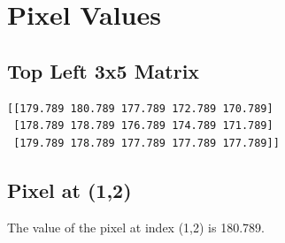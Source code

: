 \documentclass[journal]{IEEEtran}
\begin{document}
\section{Pixel Values}

\subsection{Top Left 3x5 Matrix}
\begin{verbatim}
[[179.789 180.789 177.789 172.789 170.789]
 [178.789 178.789 176.789 174.789 171.789]
 [179.789 178.789 177.789 177.789 177.789]]
\end{verbatim}

\subsection{Pixel at (1,2)}
The value of the pixel at index (1,2) is 180.789.


\end{document}
